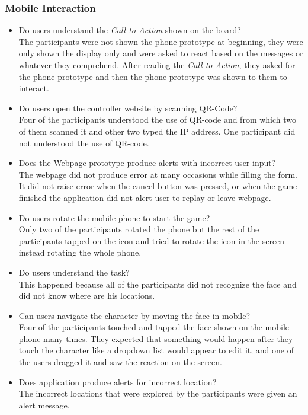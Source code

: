 \subsubsection {Mobile Interaction}
\begin{itemize}
\item Do users understand the \emph{Call-to-Action} shown on the board?\\ 
The participants were not shown the phone prototype at beginning, they were only shown the display only and were asked to react based on the messages or whatever they comprehend. After reading the \emph{Call-to-Action}, they asked for the phone prototype and then the phone prototype was shown to them to interact. 

\item Do users open the controller website by scanning QR-Code?\\ 
Four of the participants understood the use of QR-code and from which two of them scanned it and other two typed the IP address. One participant did not understood the use of QR-code.

\item Does the Webpage prototype produce alerts with incorrect user input?\\ 
The webpage did not produce error at many occasions while filling the form. It did not raise error when the cancel button was pressed, or when the game finished the application did not alert user to replay or leave webpage.

\item Do users rotate the mobile phone to start the game?\\ 
Only two of the participants rotated the phone but the rest of the participants tapped on the icon and tried to rotate the icon in the screen instead rotating the whole phone.

\item Do users understand the task?\\ 
This happened because all of the participants did not recognize the face and did not know where are his locations.

\item Can users navigate the character by moving the face in mobile?\\ 
Four of the participants touched and tapped the face shown on the mobile phone many times. They expected that something would happen after they touch the character like a dropdown list would appear to edit it, and one of the users dragged it and saw the reaction on the screen.

\item Does application produce alerts for incorrect location?\\ 
The incorrect locations that were explored by the participants were given an alert message.

\end{itemize}

